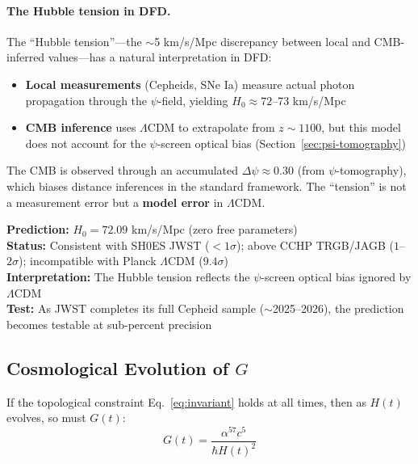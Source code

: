 \paragraph{The Hubble tension in DFD.}
The ``Hubble tension''---the $\sim$5 km/s/Mpc discrepancy between local and CMB-inferred values---has a natural interpretation in DFD:
\begin{itemize}
\item \textbf{Local measurements} (Cepheids, SNe Ia) measure actual photon propagation through the $\psi$-field, yielding $H_0 \approx 72$--73 km/s/Mpc
\item \textbf{CMB inference} uses $\Lambda$CDM to extrapolate from $z \sim 1100$, but this model does not account for the $\psi$-screen optical bias (Section~\ref{sec:psi-tomography})
\end{itemize}
The CMB is observed through an accumulated $\Delta\psi \approx 0.30$ (from $\psi$-tomography), which biases distance inferences in the standard framework. The ``tension'' is not a measurement error but a \textbf{model error} in $\Lambda$CDM.

\begin{tcolorbox}[colback=green!5!white, colframe=green!60!black, title=The G-H$_0$ Link: Sharp Prediction]
\textbf{Prediction:} $H_0 = 72.09$ km/s/Mpc (zero free parameters)\\[2pt]
\textbf{Status:} Consistent with SH0ES JWST ($<1\sigma$); above CCHP TRGB/JAGB ($1$--$2\sigma$); incompatible with Planck $\Lambda$CDM ($9.4\sigma$)\\[2pt]
\textbf{Interpretation:} The Hubble tension reflects the $\psi$-screen optical bias ignored by $\Lambda$CDM\\[2pt]
\textbf{Test:} As JWST completes its full Cepheid sample ($\sim$2025--2026), the prediction becomes testable at sub-percent precision
\end{tcolorbox}

\subsection{Cosmological Evolution of $G$}

If the topological constraint Eq.~\eqref{eq:invariant} holds at all times, then as $H(t)$ evolves, so must $G(t)$:
\begin{equation}
G(t) = \frac{\alpha^{57} c^5}{\hbar H(t)^2}
\label{eq:G-evolution}
\end{equation}

